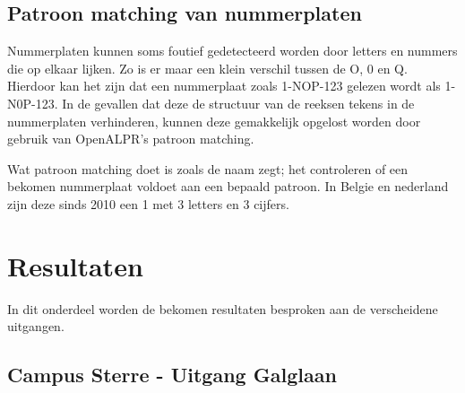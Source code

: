 \subsection{Patroon matching van nummerplaten}
Nummerplaten kunnen soms foutief gedetecteerd worden door letters en nummers die op elkaar lijken. Zo is er maar een klein verschil tussen de O, 0 en Q. 
Hierdoor kan het zijn dat een nummerplaat zoals 1-NOP-123 gelezen wordt als 1-N0P-123. In de gevallen dat deze de structuur van de reeksen tekens in de nummerplaten verhinderen, kunnen deze gemakkelijk opgelost worden door gebruik van OpenALPR's patroon matching.

Wat patroon matching doet is zoals de naam zegt; het controleren of een bekomen nummerplaat voldoet aan een bepaald patroon. In Belgie en nederland zijn deze sinds 2010 een 1 met 3 letters en 3 cijfers.

\section{Resultaten}
In dit onderdeel worden de bekomen resultaten besproken aan de verscheidene uitgangen.

\subsection{Campus Sterre - Uitgang Galglaan}

